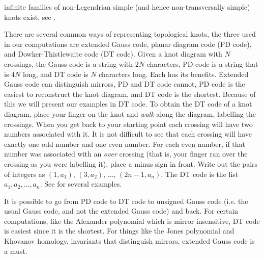 \documentclass{article}
\theoremstyle{plain}
\begin{document}
        infinite families of non-Legendrian simple (and hence
        non-transversally simple) knots exist,
        see \cite{vfoldvari2019legnonsimple}.
        \par\hfill\par
        There are several common ways of representing topological knots, the
        three used in our computations are extended Gauss code, planar diagram
        code (PD code), and Dowker-Thistlewaite code (DT code). Given a knot
        diagram with $N$ crossings, the Gauss code is a string with $2N$
        characters, PD code is a string that is $4N$ long, and DT code is $N$
        characters long. Each has its benefits. Extended Gauss code can
        distinguish mirrors, PD and DT code cannot, PD code is the easiest to
        reconstruct the knot diagram, and DT code is the shortest. Because of
        this we will present our examples in DT code. To obtain the DT code of
        a knot diagram, place your finger on the knot and \textit{walk} along
        the diagram, labelling the crossings. When you get back to your starting
        point each crossing will have two numbers associated with it. It is
        not difficult to see that each crossing will have exactly one odd number
        and one even number. For each even number, if that number was associated
        with an \textit{over} crossing (that is, your finger ran over the
        crossing as you were labelling it), place a minus sign in front. Write
        out the pairs of integers as $(1,a_{1})$, $(3,a_{2})$, $\dots$,
        $(2n-1,a_{n})$. The DT code is the list $a_{1},a_{2},\dots,a_{n}$.
        See \cite{KatlasDTCode} for several examples.
        \par\hfill\par
        It is possible to go from PD code to DT code to unsigned
        Gauss code (i.e. the usual Gauss code, and not the extended Gauss code)
        and back. For certain computations, like the Alexander polynomial which
        is mirror insensitive, DT code is easiest since it is the shortest.
        For things like the Jones polynomial and Khovanov homology, invariants
        that distinguish mirrors, extended Gauss code is a must.
\end{document}

